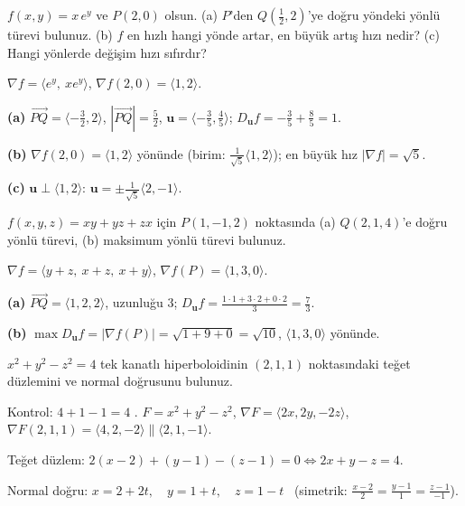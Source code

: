 \begin{soru}
$f(x,y)=x\,e^{y}$ ve $P(2,0)$ olsun. (a) $P$'den $Q(\frac12,2)$'ye doğru yöndeki yönlü türevi bulunuz. (b) $f$ en hızlı
hangi yönde artar, en büyük artış hızı nedir? (c) Hangi yönlerde değişim hızı sıfırdır?
\end{soru}
\begin{cevap}
$\nabla f=\langle e^{y},\ x e^{y}\rangle$, $\nabla f(2,0)=\langle1,2\rangle$.

\textbf{(a)} $\overrightarrow{PQ}=\langle-\frac32,2\rangle$, $|\overrightarrow{PQ}|=\frac52$, $\mathbf u=\langle-\frac35,\frac45\rangle$;
$D_{\mathbf u}f=-\frac35+\frac85=\boxed{1}$.

\textbf{(b)} $\nabla f(2,0)=\langle1,2\rangle$ yönünde (birim: $\frac{1}{\sqrt5}\langle1,2\rangle$); en büyük hız $|\nabla f|=\sqrt5$.

\textbf{(c)} $\mathbf u\perp\langle1,2\rangle$: $\mathbf u=\pm\frac{1}{\sqrt5}\langle2,-1\rangle$.
\end{cevap}

\begin{soru}
$f(x,y,z)=xy+yz+zx$ için $P(1,-1,2)$ noktasında (a) $Q(2,1,4)$'e doğru yönlü türevi, (b) maksimum yönlü türevi bulunuz.
\end{soru}
\begin{cevap}
$\nabla f=\langle y+z,\ x+z,\ x+y\rangle$, $\nabla f(P)=\langle1,3,0\rangle$.

\textbf{(a)} $\overrightarrow{PQ}=\langle1,2,2\rangle$, uzunluğu $3$; $D_{\mathbf u}f=\frac{1\cdot1+3\cdot2+0\cdot2}{3}=\boxed{\frac73}$.

\textbf{(b)} $\max D_{\mathbf u}f=|\nabla f(P)|=\sqrt{1+9+0}=\boxed{\sqrt{10}}$, $\langle1,3,0\rangle$ yönünde.
\end{cevap}

\begin{soru}
$x^2+y^2-z^2=4$ tek kanatlı hiperboloidinin $(2,1,1)$ noktasındaki teğet düzlemini ve normal doğrusunu bulunuz.
\end{soru}
\begin{cevap}
Kontrol: $4+1-1=4$ \checkmark. $F=x^2+y^2-z^2$, $\nabla F=\langle2x,2y,-2z\rangle$, $\nabla F(2,1,1)=\langle4,2,-2\rangle\parallel\langle2,1,-1\rangle$.

Teğet düzlem: $2(x-2)+(y-1)-(z-1)=0\iff\boxed{2x+y-z=4}$.

Normal doğru: $x=2+2t,\quad y=1+t,\quad z=1-t$ \ (simetrik: $\frac{x-2}{2}=\frac{y-1}{1}=\frac{z-1}{-1}$).
\end{cevap}
